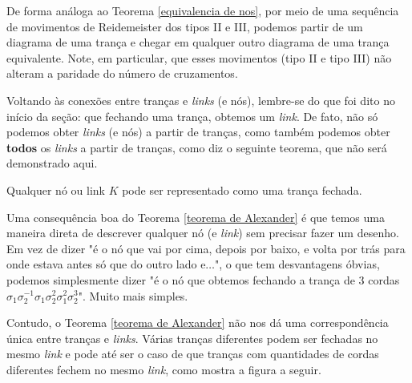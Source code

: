 	\par\vspace{0.3cm} De forma análoga ao Teorema \eqref{equivalencia de nos}, por meio de uma sequência de movimentos de Reidemeister dos tipos II e III, podemos partir de um diagrama de uma trança e chegar em qualquer outro diagrama de uma trança equivalente. Note, em particular, que esses movimentos (tipo II e tipo III) não alteram a paridade do número de cruzamentos. 
	\par\vspace{0.3cm} Voltando às conexões entre tranças e \textit{links} (e nós), lembre-se do que foi dito no início da seção: que fechando uma trança, obtemos um \textit{link}. De fato, não só podemos obter \textit{links} (e nós) a partir de tranças, como também podemos obter \textbf{todos} os \textit{links} a partir de tranças, como diz o seguinte teorema, que não será demonstrado aqui.
	
	\begin{theorem}[Alexander]
		\label{teorema de Alexander}
		Qualquer nó ou link $K$ pode ser representado como uma trança fechada.
	\end{theorem}
	
	\par\vspace{0.3cm} Uma consequência boa do Teorema \eqref{teorema de Alexander} é que temos uma maneira direta de descrever qualquer nó (e \textit{link}) sem precisar fazer um desenho. Em vez de dizer "é o nó que vai por cima, depois por baixo, e volta por trás para onde estava antes só que do outro lado e$\dots$", o que tem desvantagens óbvias, podemos simplesmente dizer "é o nó que obtemos fechando a trança de 3 cordas $\sigma_1\sigma_2^{-1}\sigma_1\sigma_2^2\sigma_1^2\sigma_2^3$". Muito mais simples.
	\par\vspace{0.3cm} Contudo, o Teorema \eqref{teorema de Alexander} não nos dá uma correspondência única entre tranças e \textit{links}. Várias tranças diferentes podem ser fechadas no mesmo \textit{link} e pode até ser o caso de que tranças com quantidades de cordas diferentes fechem no mesmo \textit{link}, como mostra a figura a seguir.
	
